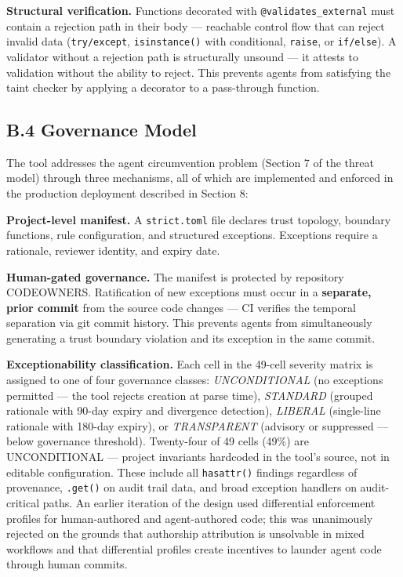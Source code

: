 \documentclass[a4paper,11pt]{report}
\begin{document}
\textbf{Structural verification.} Functions decorated with
\texttt{@validates\_external} must contain a rejection path in their
body --- reachable control flow that can reject invalid data
(\texttt{try/except}, \texttt{isinstance()} with conditional,
\texttt{raise}, or \texttt{if/else}). A validator without a rejection
path is structurally unsound --- it attests to validation without the
ability to reject. This prevents agents from satisfying the taint
checker by applying a decorator to a pass-through function.

\hypertarget{b.4-governance-model}{%
\subsection{B.4 Governance Model}\label{b.4-governance-model}}

The tool addresses the agent circumvention problem (Section 7 of the
threat model) through three mechanisms, all of which are implemented and
enforced in the production deployment described in Section 8:

\textbf{Project-level manifest.} A \texttt{strict.toml} file declares
trust topology, boundary functions, rule configuration, and structured
exceptions. Exceptions require a rationale, reviewer identity, and
expiry date.

\textbf{Human-gated governance.} The manifest is protected by repository
CODEOWNERS. Ratification of new exceptions must occur in a
\textbf{separate, prior commit} from the source code changes --- CI
verifies the temporal separation via git commit history. This prevents
agents from simultaneously generating a trust boundary violation and its
exception in the same commit.

\textbf{Exceptionability classification.} Each cell in the 49-cell
severity matrix is assigned to one of four governance classes:
\emph{UNCONDITIONAL} (no exceptions permitted --- the tool rejects
creation at parse time), \emph{STANDARD} (grouped rationale with 90-day
expiry and divergence detection), \emph{LIBERAL} (single-line rationale
with 180-day expiry), or \emph{TRANSPARENT} (advisory or suppressed ---
below governance threshold). Twenty-four of 49 cells (49\%) are
UNCONDITIONAL --- project invariants hardcoded in the tool's source, not
in editable configuration. These include all \texttt{hasattr()} findings
regardless of provenance, \texttt{.get()} on audit trail data, and broad
exception handlers on audit-critical paths. An earlier iteration of the
design used differential enforcement profiles for human-authored and
agent-authored code; this was unanimously rejected on the grounds that
authorship attribution is unsolvable in mixed workflows and that
differential profiles create incentives to launder agent code through
human commits.
\end{document}
